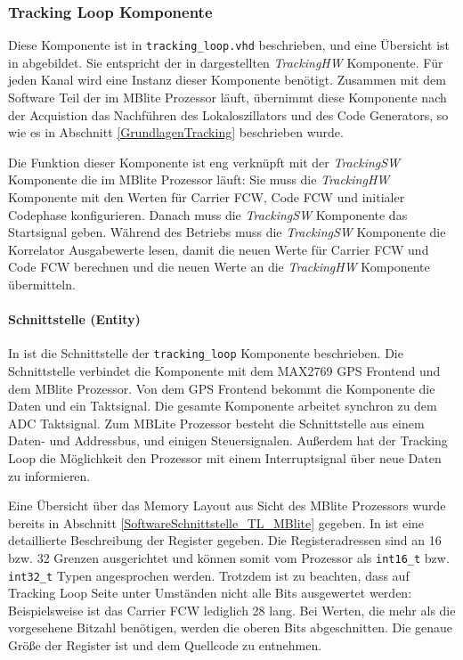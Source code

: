 \subsubsection{Tracking  Loop Komponente}
Diese Komponente ist in \lstinline$tracking_loop.vhd$ beschrieben, und eine Übersicht ist in  abgebildet. Sie entspricht der in  dargestellten \emph{TrackingHW} Komponente. Für jeden Kanal wird eine Instanz dieser Komponente benötigt. Zusammen mit dem Software Teil der im MBlite Prozessor läuft, übernimmt diese Komponente nach der Acquistion das Nachführen des Lokaloszillators und des Code Generators, so wie es in Abschnitt \ref{GrundlagenTracking} beschrieben wurde.

Die Funktion dieser Komponente ist eng verknüpft mit der \emph{TrackingSW} Komponente die im MBlite Prozessor läuft: Sie muss die \emph{TrackingHW} Komponente mit den Werten für Carrier FCW, Code FCW und initialer Codephase konfigurieren. Danach muss die \emph{TrackingSW} Komponente das Startsignal geben. Während des Betriebs muss die \emph{TrackingSW} Komponente die Korrelator Ausgabewerte lesen, damit die neuen Werte für Carrier FCW und Code FCW berechnen und die neuen Werte an die \emph{TrackingHW} Komponente übermitteln.


\paragraph{Schnittstelle (Entity)}
\label{ImplMemoryMapTrackingloop}
In  ist die Schnittstelle der \lstinline$tracking_loop$ Komponente beschrieben. Die Schnittstelle verbindet die Komponente mit dem MAX2769 GPS Frontend und dem MBlite Prozessor. Von dem GPS Frontend bekommt die Komponente die Daten und ein Taktsignal. Die gesamte Komponente arbeitet synchron zu dem ADC Taktsignal. Zum MBLite Prozessor besteht die Schnittstelle aus einem Daten- und Addressbus, und einigen Steuersignalen. Außerdem hat der Tracking Loop die Möglichkeit den Prozessor mit einem Interruptsignal über neue Daten zu informieren.

Eine Übersicht über das Memory Layout aus Sicht des MBlite Prozessors wurde bereits in Abschnitt \ref{SoftwareSchnittstelle_TL_MBlite} gegeben. In   ist eine detaillierte Beschreibung der Register gegeben. Die Registeradressen sind an \num{16} bzw. \SI{32}{\bit} Grenzen ausgerichtet und können somit vom Prozessor als \lstinline$int16_t$ bzw. \lstinline$int32_t$ Typen angesprochen werden. Trotzdem ist zu beachten, dass auf Tracking Loop Seite unter Umständen nicht alle Bits ausgewertet werden: Beispielsweise ist das Carrier FCW lediglich \SI{28}{\bit} lang. Bei Werten, die mehr als die vorgesehene Bitzahl benötigen, werden die oberen Bits abgeschnitten. Die genaue Größe der Register ist  und dem Quellcode zu entnehmen.

